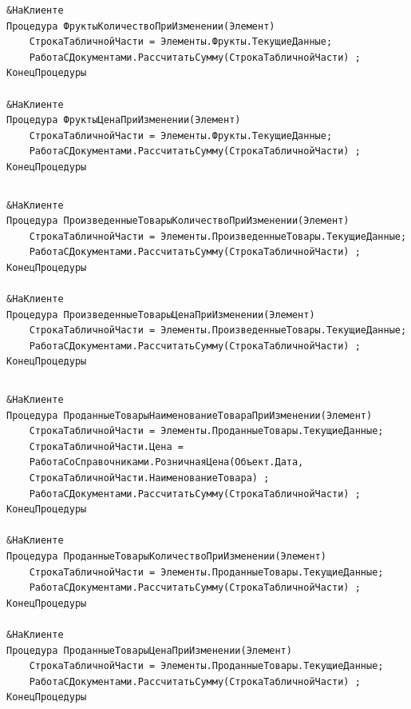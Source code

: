 \documentclass[12pt,a4paper]{article}
\begin{document}
\begin{appendices}
\begin{verbatim}
&НаКлиенте
Процедура ФруктыКоличествоПриИзменении(Элемент)
    СтрокаТабличнойЧасти = Элементы.Фрукты.ТекущиеДанные;
    РаботаСДокументами.РассчитатьСумму(СтрокаТабличнойЧасти) ;
КонецПроцедуры

&НаКлиенте
Процедура ФруктыЦенаПриИзменении(Элемент)
    СтрокаТабличнойЧасти = Элементы.Фрукты.ТекущиеДанные;
    РаботаСДокументами.РассчитатьСумму(СтрокаТабличнойЧасти) ;
КонецПроцедуры
\end{verbatim}

\begin{lstlisting}[caption=Процедуры для автоматического пересчета суммы (Приходная накладная)]
\end{lstlisting}

\begin{verbatim}
&НаКлиенте
Процедура ПроизведенныеТоварыКоличествоПриИзменении(Элемент)
    СтрокаТабличнойЧасти = Элементы.ПроизведенныеТовары.ТекущиеДанные;
    РаботаСДокументами.РассчитатьСумму(СтрокаТабличнойЧасти) ;
КонецПроцедуры

&НаКлиенте
Процедура ПроизведенныеТоварыЦенаПриИзменении(Элемент)
    СтрокаТабличнойЧасти = Элементы.ПроизведенныеТовары.ТекущиеДанные;
    РаботаСДокументами.РассчитатьСумму(СтрокаТабличнойЧасти) ;
КонецПроцедуры
\end{verbatim}

\begin{lstlisting}[caption=Процедуры для автоматического пересчета суммы (Товарная накладная)]
\end{lstlisting}

\begin{verbatim}
&НаКлиенте
Процедура ПроданныеТоварыНаименованиеТовараПриИзменении(Элемент) 
    СтрокаТабличнойЧасти = Элементы.ПроданныеТовары.ТекущиеДанные;
    СтрокаТабличнойЧасти.Цена =
    РаботаСоСправочниками.РозничнаяЦена(Объект.Дата,
    СтрокаТабличнойЧасти.НаименованиеТовара) ;
    РаботаСДокументами.РассчитатьСумму(СтрокаТабличнойЧасти) ;
КонецПроцедуры

&НаКлиенте
Процедура ПроданныеТоварыКоличествоПриИзменении(Элемент)
    СтрокаТабличнойЧасти = Элементы.ПроданныеТовары.ТекущиеДанные;
    РаботаСДокументами.РассчитатьСумму(СтрокаТабличнойЧасти) ;
КонецПроцедуры

&НаКлиенте
Процедура ПроданныеТоварыЦенаПриИзменении(Элемент)
    СтрокаТабличнойЧасти = Элементы.ПроданныеТовары.ТекущиеДанные;
    РаботаСДокументами.РассчитатьСумму(СтрокаТабличнойЧасти) ;
КонецПроцедуры
\end{verbatim}


\end{appendices}
\end{document}
